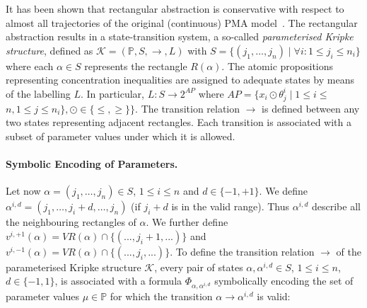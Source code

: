 \documentclass{llncs}
\newcommand{\VR}{\mathit{VR}}
\begin{document}
It has been shown that rectangular abstraction is conservative with respect to almost all trajectories of the original (continuous) PMA model~\cite{Batt2007}. %
The rectangular abstraction results in a state-transition system, a so-called \emph{parameterised Kripke structure}, defined as $\mathcal{K}=(\mathbb{P},S,\rightarrow,L)$ with $S = \{ (j_1, \ldots, j_n) \mid \forall i : 1 \le j_i \le n_i \}$ where each $\alpha \in S$ represents the rectangle $R(\alpha)$.  The atomic propositions representing concentration inequalities are assigned to adequate states by means of the labelling $L$. In particular, $L: S\rightarrow 2^{AP}$ where 
$AP=\{x_i\odot\theta^i_j\mid 1\leq i\leq$ $n,1\leq j\leq n_i\},\odot\in\{\leq,\geq\}\}$. The transition relation $\rightarrow$ is defined between any two states representing adjacent rectangles. Each transition is associated with a subset of parameter values under which it is allowed. %

\paragraph{Symbolic Encoding of Parameters.}

Let now $\alpha = (j_1, \ldots, j_n) \in S$, $1 \le i \le n$ and $d \in \{-1, +1\}$.
We define $\alpha^{i,d} = (j_1, \ldots, j_i + d, \ldots, j_n)$
(if $j_i + d$ is in the valid range). Thus $\alpha^{i,d}$ describe all
the neighbouring rectangles of $\alpha$.
We further define
$v^{i,+1}(\alpha) = \VR(\alpha) \cap \{ (..., j_i+1, ...) \}$ and
$v^{i,-1}(\alpha) = \VR(\alpha) \cap \{ (..., j_i, ...) \}$.
To define the transition relation $\rightarrow$ of the parameterised Kripke structure $\mathcal K$, every pair of states $\alpha,\alpha^{i,d}\in S$, $1\leq i\leq n$, $d\in\{-1,1\}$, is associated with a formula $\Phi_{\alpha,\alpha^{i,d}}$ symbolically encoding the set of parameter values $\mu\in\mathbb{P}$ for which the transition $\alpha\rightarrow\alpha^{i,d}$ is valid:
\end{document}
